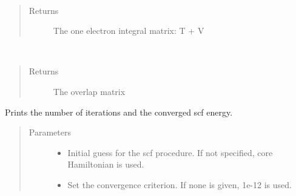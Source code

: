 \documentclass[letterpaper,10pt,english]{sphinxmanual}
\begin{document}
\begin{fulllineitems}
\begin{fulllineitems}
\label{\detokenize{RHF:hf.HartreeFock.RHF.MF.get_one_e}}~\begin{quote}\begin{description}
\item[{Returns}] \leavevmode
The one electron integral matrix: T + V

\end{description}\end{quote}

\end{fulllineitems}


\begin{fulllineitems}
\label{\detokenize{RHF:hf.HartreeFock.RHF.MF.get_ovlp}}~\begin{quote}\begin{description}
\item[{Returns}] \leavevmode
The overlap matrix

\end{description}\end{quote}

\end{fulllineitems}


\begin{fulllineitems}
\label{\detokenize{RHF:hf.HartreeFock.RHF.MF.get_scf_solution}}
Prints the number of iterations and the converged scf energy.
\begin{quote}\begin{description}
\item[{Parameters}] \leavevmode\begin{itemize}
\item {} 
 \textendash{} Initial guess for the scf procedure. If not specified, core Hamiltonian is used.

\item {} 
 \textendash{} Set the convergence criterion. If none is given, 1e-12 is used.


\end{itemize}
\end{description}
\end{quote}
\end{fulllineitems}
\end{fulllineitems}
\end{document}
